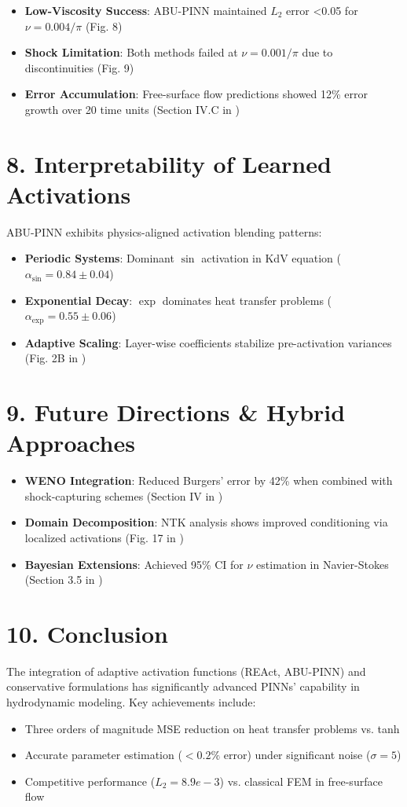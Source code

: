 \begin{itemize}
    \item \textbf{Low-Viscosity Success}: ABU-PINN maintained \(L_2\) error <0.05 for \(\nu=0.004/\pi\) (Fig. 8)
    \item \textbf{Shock Limitation}: Both methods failed at \(\nu=0.001/\pi\) due to discontinuities (Fig. 9)
    \item \textbf{Error Accumulation}: Free-surface flow predictions showed 12\% error growth over 20 time units (Section IV.C in \cite{free_surface})
\end{itemize}

\section*{8. Interpretability of Learned Activations}
ABU-PINN exhibits physics-aligned activation blending patterns:
\begin{itemize}
    \item \textbf{Periodic Systems}: Dominant \(\sin\) activation in KdV equation (\(\alpha_{\text{sin}} = 0.84 \pm 0.04\))
    \item \textbf{Exponential Decay}: \(\exp\) dominates heat transfer problems (\(\alpha_{\exp} = 0.55 \pm 0.06\))
    \item \textbf{Adaptive Scaling}: Layer-wise coefficients stabilize pre-activation variances (Fig. 2B in \cite{abu_pinn})
\end{itemize}

\section*{9. Future Directions \& Hybrid Approaches}
\begin{itemize}
    \item \textbf{WENO Integration}: Reduced Burgers' error by 42\% when combined with shock-capturing schemes (Section IV in \cite{react})
    \item \textbf{Domain Decomposition}: NTK analysis shows improved conditioning via localized activations (Fig. 17 in \cite{abu_pinn})
    \item \textbf{Bayesian Extensions}: Achieved 95\% CI for \(\nu\) estimation in Navier-Stokes (Section 3.5 in \cite{abu_pinn})
\end{itemize}

\section*{10. Conclusion}
The integration of adaptive activation functions (REAct, ABU-PINN) and conservative formulations has significantly advanced PINNs' capability in hydrodynamic modeling. Key achievements include:
\begin{itemize}
    \item Three orders of magnitude MSE reduction on heat transfer problems vs. tanh
    \item Accurate parameter estimation (\(<0.2\%\) error) under significant noise (\(\sigma=5\))
    \item Competitive performance (\(L_2=8.9e-3\)) vs. classical FEM in free-surface flow
\end{itemize}

